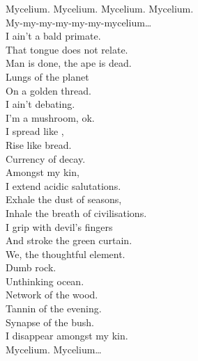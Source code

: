 
\label{album:ice-death-planets-mushrooms-lava}





Mycelium. Mycelium. Mycelium. Mycelium. \\
My-my-my-my-my-my-mycelium… \\

I ain't a bald primate. \\
That tongue does not relate. \\
Man is done, the ape is dead. \\
Lungs of the planet \\
On a golden thread. \\
I ain't debating. \\
I'm a mushroom, ok. \\
I spread like , \\
Rise like bread. \\
Currency of decay. \\

Amongst my kin, \\
I extend acidic salutations. \\
Exhale the dust of seasons, \\
Inhale the breath of civilisations. \\
I grip with devil's fingers \\
And stroke the green curtain. \\
We, the thoughtful element. \\

Dumb rock. \\
Unthinking ocean. \\
Network of the wood. \\
Tannin of the evening. \\
Synapse of the bush. \\
I disappear amongst my kin. \\

Mycelium. Mycelium… \\


